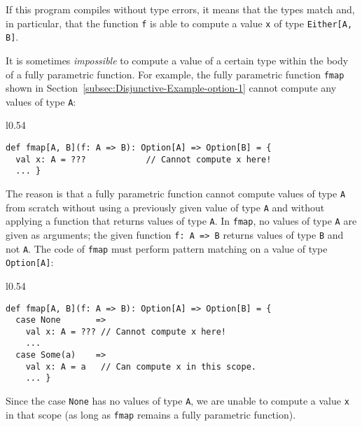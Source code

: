 \noindent If this program compiles without type errors, it means that
the types match and, in particular, that the function \lstinline!f!
is able to compute a value \lstinline!x! of type \lstinline!Either[A, B]!.

It is sometimes \emph{impossible} to compute a value of a certain
type within the body of a fully parametric function. For example,
the fully parametric function \lstinline!fmap! shown in Section~\ref{subsec:Disjunctive-Example-option-1}
cannot compute any values of type \lstinline!A!:

\begin{wrapfigure}{l}{0.54\columnwidth}%
\vspace{-0.65\baselineskip}
\begin{lstlisting}
def fmap[A, B](f: A => B): Option[A] => Option[B] = {
  val x: A = ???            // Cannot compute x here!
  ... }
\end{lstlisting}

\vspace{-0.9\baselineskip}
\end{wrapfigure}%

\noindent The reason is that a fully parametric function cannot compute
values of type \lstinline!A! from scratch without using a previously
given value of type \lstinline!A! and without applying a function
that returns values of type \lstinline!A!. In \lstinline!fmap!,
no values of type \lstinline!A! are given as arguments; the given
function \lstinline!f: A => B! returns values of type \lstinline!B!
and not \lstinline!A!. The code of \lstinline!fmap! must perform
pattern matching on a value of type \lstinline!Option[A]!:

\begin{wrapfigure}{l}{0.54\columnwidth}%
\vspace{-0.65\baselineskip}
\begin{lstlisting}
def fmap[A, B](f: A => B): Option[A] => Option[B] = {
  case None       => 
    val x: A = ??? // Cannot compute x here!
    ...
  case Some(a)    =>
    val x: A = a   // Can compute x in this scope.
    ... }
\end{lstlisting}

\vspace{-0.9\baselineskip}
\end{wrapfigure}%

\noindent Since the case \lstinline!None! has no values of type \lstinline!A!,
we are unable to compute a value \lstinline!x! in that scope (as
long as \lstinline!fmap! remains a fully parametric function). 

